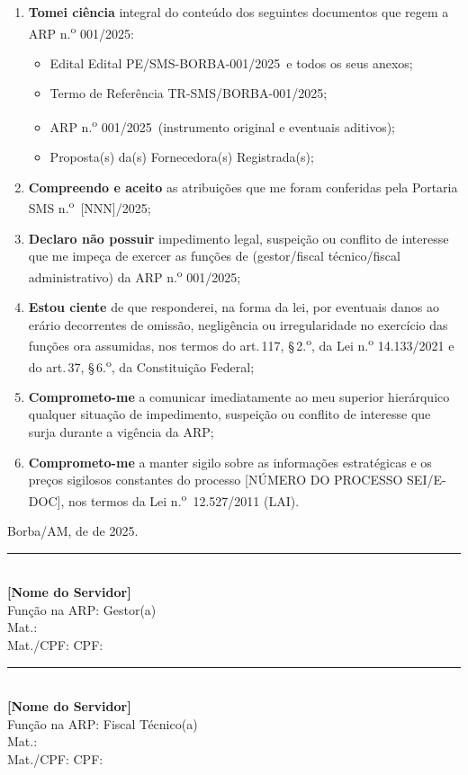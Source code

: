 \documentclass[12pt,a4paper]{article}
\newcommand{\art}[1]{art.\,#1}
\newcommand{\blank}[1]{\underline{\hspace{#1}}}
\newcommand{\assinatura}[4]{%
  \begin{center}\vspace{0.2cm}
  \rule{8cm}{0.5pt}\\[3pt]
  \textbf{#1}\\
  \small #2\\
  \small #3\\
  \small Mat./CPF: #4
  \end{center}}
\newcommand{\portNum}{[NNN]}          %
\newcommand{\exercicio}{2025}
\newcommand{\arpRef}{ARP n.\textsuperscript{o} 001/2025}
\newcommand{\editalRef}{Edital PE/SMS-BORBA-001/2025}
\newcommand{\trRef}{TR-SMS/BORBA-001/2025}
\newcommand{\procNum}{[NÚMERO DO PROCESSO SEI/E-DOC]}
\begin{document}
\begin{enumerate}
  \item \textbf{Tomei ciência} integral do conteúdo dos seguintes documentos
    que regem a \arpRef:
    \begin{itemize}
      \item Edital \editalRef\ e todos os seus anexos;
      \item Termo de Referência \trRef;
      \item \arpRef\ (instrumento original e eventuais aditivos);
      \item Proposta(s) da(s) Fornecedora(s) Registrada(s);
    \end{itemize}

  \item \textbf{Compreendo e aceito} as atribuições que me foram conferidas
    pela Portaria SMS n.\textsuperscript{o}~\portNum/\exercicio;

  \item \textbf{Declaro não possuir} impedimento legal, suspeição ou
    conflito de interesse que me impeça de exercer as funções de
    \blank{5cm} (gestor/fiscal técnico/fiscal administrativo) da \arpRef;

  \item \textbf{Estou ciente} de que responderei, na forma da lei, por
    eventuais danos ao erário decorrentes de omissão, negligência ou
    irregularidade no exercício das funções ora assumidas, nos termos do
    \art{117}, \S\,2.\textsuperscript{o}, da Lei n.\textsuperscript{o}
    14.133/2021 e do \art{37}, \S\,6.\textsuperscript{o}, da Constituição
    Federal;

  \item \textbf{Comprometo-me} a comunicar imediatamente ao meu superior
    hierárquico qualquer situação de impedimento, suspeição ou conflito de
    interesse que surja durante a vigência da ARP;

  \item \textbf{Comprometo-me} a manter sigilo sobre as informações
    estratégicas e os preços sigilosos constantes do processo
    \procNum, nos termos da Lei n.\textsuperscript{o}~12.527/2011 (LAI).
\end{enumerate}

\vspace{1.2cm}
\begin{center}
  Borba/AM, \blank{0.8cm} de \blank{3cm} de \exercicio.
\end{center}

\vspace{1.2cm}
\begin{minipage}{0.47\linewidth}
  \assinatura{[Nome do Servidor]}{Função na ARP: Gestor(a)}{Mat.: \blank{2cm}}{CPF: \blank{3cm}}
\end{minipage}
\hfill
\begin{minipage}{0.47\linewidth}
  \assinatura{[Nome do Servidor]}{Função na ARP: Fiscal Técnico(a)}{Mat.: \blank{2cm}}{CPF: \blank{3cm}}
\end{minipage}
\end{document}

